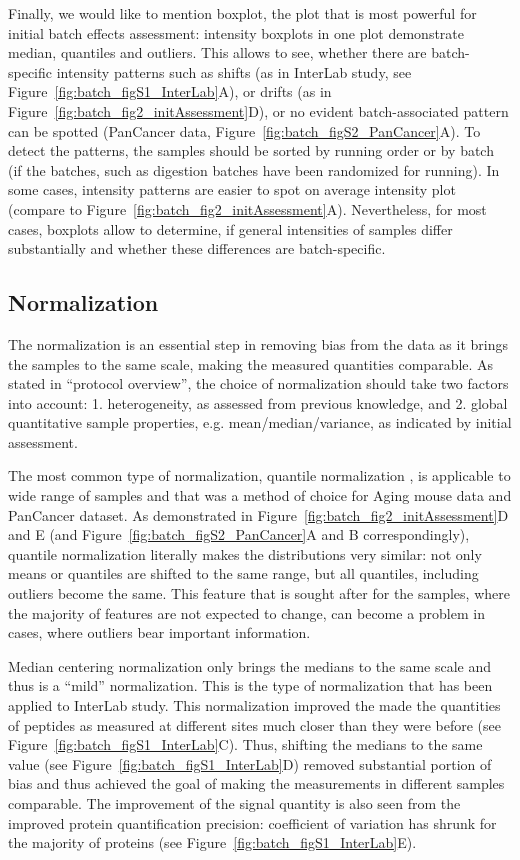\documentclass[num-refs]{wiley-article}
\begin{document}
Finally, we would like to mention boxplot, the plot that is most powerful for initial batch effects assessment: intensity boxplots in one plot demonstrate median, quantiles and outliers. This allows to see, whether there are batch-specific intensity patterns such as shifts (as in InterLab study, see Figure~\ref{fig:batch_figS1_InterLab}A), or drifts (as in Figure~\ref{fig:batch_fig2_initAssessment}D), or no evident batch-associated pattern can be spotted (PanCancer data, Figure~\ref{fig:batch_figS2_PanCancer}A). To detect the patterns, the samples should be sorted by running order or by batch (if the batches, such as digestion batches have been randomized for running). In some cases, intensity patterns are easier to spot on average intensity plot (compare to Figure~\ref{fig:batch_fig2_initAssessment}A). Nevertheless, for most cases, boxplots allow to determine, if general intensities of samples differ substantially and whether these differences are batch-specific.

\subsection{Normalization}

The normalization is an essential step in removing bias from the data as it brings the samples to the same scale, making the measured quantities comparable. As stated in “protocol overview”, the choice of normalization should take two factors into account: 
1. heterogeneity, as assessed from previous knowledge, and 2. global quantitative sample properties, e.g. mean/median/variance, as indicated by initial assessment.

The most common type of normalization, quantile normalization \cite{Bolstad2003}, is applicable to wide range of samples and that was a method of choice for Aging mouse data and PanCancer dataset. As demonstrated in Figure~\ref{fig:batch_fig2_initAssessment}D and E (and Figure~\ref{fig:batch_figS2_PanCancer}A and B correspondingly), quantile normalization literally makes the distributions very similar: not only means or quantiles are shifted to the same range, but all quantiles, including outliers become the same. This feature that is sought after for the samples, where the majority of features are not expected to change, can become a problem in cases, where outliers bear important information.

Median centering normalization only brings the medians to the same scale and thus is a “mild” normalization. This is the type of normalization that has been applied to InterLab study. This normalization improved the made the quantities of peptides as measured at different sites much closer than they were before (see Figure~\ref{fig:batch_figS1_InterLab}C). Thus, shifting the medians to the same value (see Figure~\ref{fig:batch_figS1_InterLab}D) removed substantial portion of bias and thus achieved the goal of making the measurements in different samples comparable. The improvement of the signal quantity is also seen from the improved protein quantification precision: coefficient of variation has shrunk for the majority of proteins (see Figure~\ref{fig:batch_figS1_InterLab}E).
\end{document}
